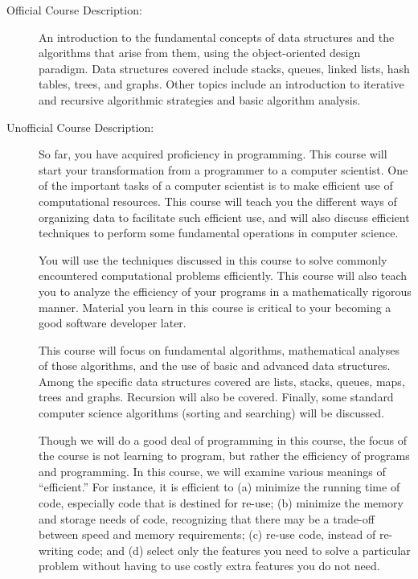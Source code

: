 \documentclass [letterpaper,11pt]{article}
\begin{document}
\begin{description}

\item[Official Course Description:]
An introduction to the fundamental concepts of data structures and the algorithms that arise from them, using the object-oriented design
paradigm. Data structures covered include stacks, queues, linked lists, hash tables, trees, and graphs. Other topics include an introduction
to iterative and recursive algorithmic strategies and basic algorithm analysis.

\item[Unofficial Course Description:]
So far, you have acquired proficiency in programming. This course will start your transformation from a programmer to a computer scientist. One of the important tasks of a computer scientist is to make efficient use of computational resources. This course will teach you the different ways of organizing data to facilitate such efficient use, and will also discuss efficient techniques to perform some fundamental operations in computer science.

You will use the techniques discussed in this course to solve commonly encountered computational problems efficiently. This course will also teach you to analyze the efficiency of your programs in a mathematically rigorous manner. Material you learn in this course is critical to your becoming a good software developer later.

This course will focus on fundamental algorithms, mathematical analyses of those algorithms, and the use of basic and advanced data structures. Among the specific data structures covered are lists, stacks, queues, maps, trees and graphs. Recursion will also be covered.  Finally, some standard computer science algorithms (sorting and searching) will be discussed.

Though we will do a good deal of programming in this course, the focus of the course is not
learning to program, but rather the efficiency of programs and programming. In this course, we will examine various meanings of ``efficient.''  For instance, it is efficient to (a) minimize the running time of code, especially code that is destined for re-use; (b) minimize the memory and storage needs of code, recognizing that there may be a trade-off between speed and memory requirements; (c) re-use code, instead of re-writing code; and (d) select only the features you need to solve a particular problem without having to use costly extra features you do not need.


\end{description}
\end{document}
